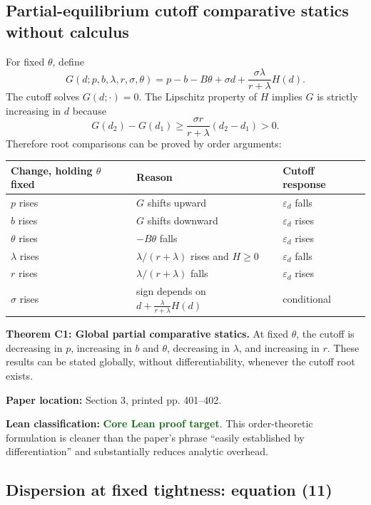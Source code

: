 \documentclass[11pt]{article}
\newcommand{\epsd}{\varepsilon_d}
\newcommand{\paperloc}[1]{\textbf{Paper location:} #1}
\newcommand{\leanclass}[1]{\textbf{Lean classification:} #1}
\newcommand{\core}{\textcolor{darkGreen}{\textbf{Core Lean proof target}}}
\newcommand{\resultname}[1]{\medskip\noindent\textbf{#1.}}
\begin{document}
\subsection{Partial-equilibrium cutoff comparative statics without calculus}

For fixed $\theta$, define
\begin{equation}
 G(d;p,b,\lambda,r,\sigma,\theta)
 =p-b-B\theta+\sigma d
 +\frac{\sigma\lambda}{r+\lambda}H(d). \tag{G}
\end{equation}
The cutoff solves $G(d;\cdot)=0$. The Lipschitz property of $H$ implies $G$ is strictly increasing in $d$ because
\[
 G(d_2)-G(d_1)
 \ge \frac{\sigma r}{r+\lambda}(d_2-d_1)>0.
\]
Therefore root comparisons can be proved by order arguments:

\begin{center}
\begin{tabularx}{0.94\textwidth}{@{}lXl@{}}
\toprule
Change, holding $\theta$ fixed & Reason & Cutoff response \\
\midrule
$p$ rises & $G$ shifts upward & $\epsd$ falls \\
$b$ rises & $G$ shifts downward & $\epsd$ rises \\
$\theta$ rises & $-B\theta$ falls & $\epsd$ rises \\
$\lambda$ rises & $\lambda/(r+\lambda)$ rises and $H\ge0$ & $\epsd$ falls \\
$r$ rises & $\lambda/(r+\lambda)$ falls & $\epsd$ rises \\
$\sigma$ rises & sign depends on $d+\frac{\lambda}{r+\lambda}H(d)$ & conditional \\
\bottomrule
\end{tabularx}
\end{center}

\resultname{Theorem C1: Global partial comparative statics}
At fixed $\theta$, the cutoff is decreasing in $p$, increasing in $b$ and $\theta$, decreasing in $\lambda$, and increasing in $r$. These results can be stated globally, without differentiability, whenever the cutoff root exists.

\paperloc{Section 3, printed pp. 401--402.}

\leanclass{\core.}
This order-theoretic formulation is cleaner than the paper's phrase ``easily established by differentiation'' and substantially reduces analytic overhead.

\subsection{Dispersion at fixed tightness: equation (11)}
\end{document}
